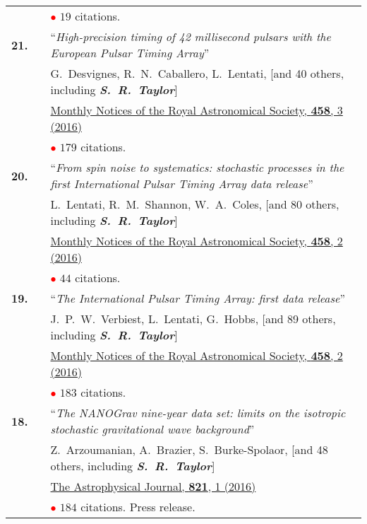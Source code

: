 \documentclass[11pt,letterpaper,sans]{moderncv}
\begin{document}
{\begin{longtable}{rp{0.3cm}p{15.8cm}}
&& \textcolor{red}{$\bullet$} $19$ citations. \vspace{0.09cm}\\
\textbf{21.} & & ``\textit{High-precision timing of 42 millisecond pulsars with the European Pulsar Timing Array}'' \\ 
&& G.~Desvignes, R.~N.~Caballero, L.~Lentati, [and 40 others, including \textit{\textbf{S.~R.~Taylor}}] \\ 
&&  \href{http://mnras.oxfordjournals.org/content/458/3/3341}{{\color{color1} Monthly Notices of the Royal Astronomical Society, \textbf{458}, 3 (2016)}} \\
&& \textcolor{red}{$\bullet$} $179$ citations. \vspace{0.09cm}\\
\textbf{20.} & & ``\textit{From spin noise to systematics: stochastic processes in the first International Pulsar Timing Array data release}'' \\ 
&& L.~Lentati, R.~M.~Shannon, W.~A.~Coles, [and 80 others, including \textit{\textbf{S.~R.~Taylor}}] \\ 
&&  \href{http://mnras.oxfordjournals.org/content/458/2/2161}{{\color{color1} Monthly Notices of the Royal Astronomical Society, \textbf{458}, 2 (2016)}} \\
&& \textcolor{red}{$\bullet$} $44$ citations. \vspace{0.09cm}\\
\textbf{19.} & & ``\textit{The International Pulsar Timing Array: first data release}'' \\ 
&& J.~P.~W.~Verbiest, L.~Lentati, G.~Hobbs, [and 89 others, including \textit{\textbf{S.~R.~Taylor}}] \\ 
&&  \href{http://mnras.oxfordjournals.org/content/458/2/1267}{{\color{color1} Monthly Notices of the Royal Astronomical Society, \textbf{458}, 2 (2016)}} \\
&& \textcolor{red}{$\bullet$} $183$ citations. \vspace{0.09cm}\\
\textbf{18.} & & ``\textit{The NANOGrav nine-year data set: limits on the isotropic stochastic gravitational wave background}'' \\ 
&& Z.~Arzoumanian, A.~Brazier, S.~Burke-Spolaor, [and 48 others, including \textit{\textbf{S.~R.~Taylor}}] \\ 
&&  \href{http://iopscience.iop.org/article/10.3847/0004-637X/821/1/13/meta}{{\color{color1} The Astrophysical Journal, \textbf{821}, 1 (2016)}} \\
&& \textcolor{red}{$\bullet$} $184$ citations. Press release. \vspace{0.09cm}\\

\end{longtable}}
\end{document}
